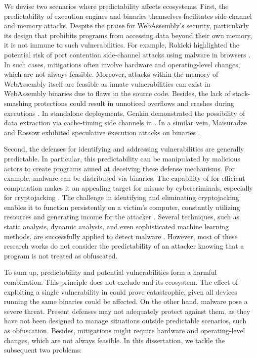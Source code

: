 We devise two scenarios where predictability affects \Wasm ecosystems.
First, the predictability of execution engines and \Wasm binaries themselves facilitates side-channel and memory attacks.
Despite the praise for WebAssembly's security, particularly its design that prohibits programs from accessing data beyond their own memory, it is not immune to such vulnerabilities. 
For example, Rokicki \etal highlighted the potential risk of port contention side-channel attacks using \Wasm malware in browsers \cite{10.1145/3488932.3517411}. 
In such cases, mitigations often involve hardware and operating-level changes, which are not always feasible.
Moreover, attacks within the memory of WebAssembly itself are feasible \cite{10296897, usenixWasm2020} as innate vulnerabilities can exist in WebAssembly binaries due to flaws in the source code. 
Besides, the lack of stack-smashing protections could result in unnoticed overflows and crashes during \Wasm executions \cite{DeRoover2022}. 
In standalone deployments, Genkin \etal demonstrated the possibility of data extraction via cache-timing side channels in \Wasm \cite{Genkin2018DrivebyKC}. 
In a similar vein, Maisuradze and Rossow exhibited speculative execution attacks on \Wasm binaries \cite{ret2spec}.


Second, the defenses for identifying and addressing vulnerabilities are generally predictable. 
In particular, this predictability can be manipulated by malicious actors to create programs aimed at deceiving these defense mechanisms. 
For example, malware can be distributed via \Wasm binaries. 
The capability of \Wasm for efficient computation makes it an appealing target for misuse by cybercriminals, especially for cryptojacking \cite{10.1145/3339252.3339261}. 
The challenge in identifying and eliminating cryptojacking enables it to function persistently on a victim's computer, constantly utilizing resources and generating income for the attacker \cite{9566204}.  
Several techniques, such as static analysis, dynamic analysis, and even sophisticated machine learning methods, are successfully applied to detect \Wasm malware \cite{Minesweeper, MinerRay, MINOS, SEISMIC, RAPID, Outguard}. 
However, most of these research works do not consider the predictability of an attacker knowing that a \Wasm program is not treated as obfuscated.






To sum up, predictability and potential vulnerabilities form a harmful combination. 
This principle does not exclude \Wasm and its ecosystem.
The effect of exploiting a single vulnerability in \Wasm could prove catastrophic, given all devices running the same \Wasm binaries could be affected. 
On the other hand, \Wasm malware pose a severe threat. 
Present defenses may not adequately protect against them, as they have not been designed to manage situations outside predictable scenarios, such as obfuscation. 
Besides, mitigations might require hardware and operating-level changes, which are not always feasible.
In this dissertation, we tackle the subsequent two problems:

